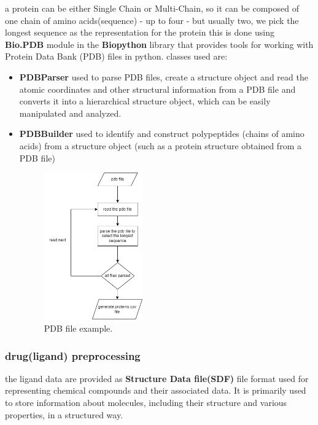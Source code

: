 \documentclass[11pt, a4paper]{article}
\begin{document}
        a protein can be either Single Chain or Multi-Chain, so it can be composed of one chain of amino acids(sequence) - up to four - but usually two, we pick the longest sequence as the representation for the protein
        this is done using \textbf{Bio.PDB} module in the \textbf{Biopython} library that provides tools for working with Protein Data Bank (PDB) files in python. classes used are:
        \begin{itemize}
            \item \textbf{PDBParser} used to parse PDB files, create a structure object and read the atomic coordinates and other structural information from a PDB file and converts it into a hierarchical structure object, which can be easily manipulated and analyzed. 
            \item \textbf{PDBBuilder} used to identify and construct polypeptides (chains of amino acids) from a structure object (such as a protein structure obtained from a PDB file)             
        
            \begin{figure}[H]
                \centering
                \includegraphics[width=0.4\textwidth]{pdb parser.png} %
                \caption{PDB file example.}
                \label{fig 4}
            \end{figure}

        \end{itemize} 

        \subsubsection{drug(ligand) preprocessing}
        the ligand data are provided as \textbf{Structure Data file(SDF)} file format used for representing chemical compounds and their associated data. It is primarily used to store information about molecules, including their structure and various properties, in a structured way.
\end{document}

